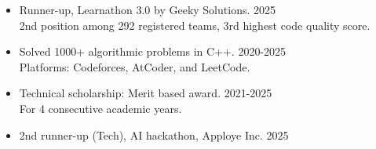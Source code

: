 \begin{itemize}
  \item Runner-up, Learnathon 3.0 by Geeky Solutions. \hfill 2025 \\2nd position among 292 registered teams, 3rd highest code quality score.
  \item Solved 1000+ algorithmic problems in C++. \hfill 2020-2025 \\Platforms: Codeforces, AtCoder, and LeetCode. 
  \item Technical scholarship: Merit based award. \hfill 2021-2025 \\For 4 consecutive academic years.
  \item 2nd runner-up (Tech), AI hackathon, Apploye Inc. \hfill 2025
\end{itemize}
